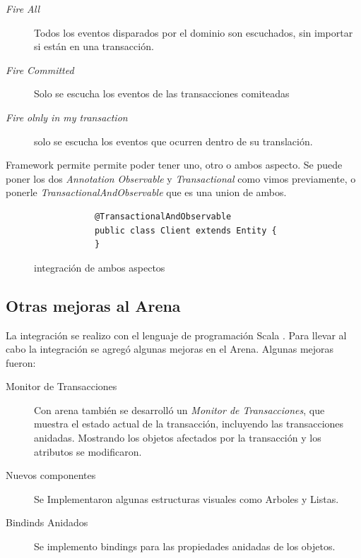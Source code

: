 	\begin{description}
		\item[\emph{Fire All}] Todos los eventos disparados por el dominio son
		escuchados, sin importar si están en una transacción.
	
		\item[\emph{Fire Committed}] Solo se escucha los eventos de las transacciones
			comiteadas
		
		\item[\emph{Fire olnly in my transaction}] solo se escucha los eventos que
			ocurren dentro de su translación.
	
	 \end{description}
	 
	Framework permite permite poder tener uno, otro o ambos aspecto. Se puede poner
	los dos \emph{Annotation} \emph{Observable} y \emph{Transactional} como vimos
	previamente, o ponerle \emph{TransactionalAndObservable} que es una union de
	ambos.
	
	\begin{figure}[h]
		\begin{lstlisting} 
			@TransactionalAndObservable
			public class Client extends Entity {
			}
		\end{lstlisting}
		\caption{integración de ambos aspectos}
		\label{TandO}
	\end{figure}  
	
	 

	
	\subsection{Otras mejoras al Arena}
	La integración se realizo con el lenguaje de programación Scala
	\cite{ref}. Para llevar al cabo la integración se agregó algunas
	mejoras en el Arena. 
	Algunas mejoras fueron:
	\begin{description}
	  \item[Monitor de Transacciones]
		 Con arena también se desarrolló un \emph{Monitor de Transacciones}, que 
		 muestra el estado actual de la transacción, incluyendo las transacciones
		 anidadas. Mostrando los objetos afectados por la transacción y los
		 atributos se modificaron.
	  \item[Nuevos componentes] Se Implementaron algunas estructuras visuales como
	  Arboles y Listas.
	  \item[Bindinds Anidados] Se implemento bindings para las propiedades
	  anidadas de los objetos.
	\end{description}
